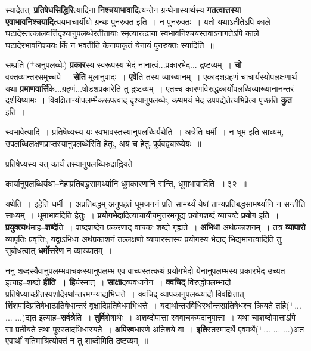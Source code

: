 \documentclass[article,12pt,a4paper]{memoir}
\newcommand{\add}[1]{($^{+}$#1)}
\begin{document}
	  \pstart स्यादेतत्--\textbf{प्रतिषेधसिद्धिरि}त्यादिना \textbf{निश्चयाभावादि}त्यन्तेन \leavevmode{} ग्रन्थेनास्यार्थस्य \textbf{गतत्वात्तस्या एवाभावनिश्चयादि}त्ययमाचार्यीयो ग्रन्थः पुनरुक्त इति । न पुनरुक्तः । यतो यथाऽतीतेऽपि काले घटादेस्तत्कालवर्त्तिदृश्यानुपलब्धेरतीतायाः स्मृत्यारूढाया स्वभावनिश्चयस्तवाऽनागतेऽपि काले घटादेरभावनिश्चयः किं न भवतीति केनापाकृतं येनायं पुनरुक्तः स्यादिति ॥
	\pend
      

	  \pstart सम्प्रति \add{अनुपलब्धेः} \textbf{प्रकार}स्य स्वरूपस्य भेदं नानात्वं...प्रकारभेद... द्रष्टव्यम् । \textbf{चो} वक्तव्यान्तरसमुच्चये । \textbf{सेति} मूलानुवादः । \textbf{एषे}ति तस्य व्याख्यानम् । एकादशग्रहणं चाचार्यस्योपलक्षणार्थं यथा \textbf{प्रमाणवार्त्ति}के...ग्रहणं...षोडशप्रकारेति तु द्रष्टव्यम् । एतच्च कारणविरुद्धकार्योपलब्धिव्याख्यानानन्तरं दर्शयिष्यामः । विवक्षितान्योपलम्भैकरूपत्वाद् दृश्यानुपलब्धेः, कथमयं भेद उपपद्येतेत्यभिप्रेत्य पृच्छति \textbf{कुत} इति ।  \leavevmode{} 
	  
	स्वभावेत्यादि । प्रतिषेध्यस्य यः स्वभावस्तस्यानुपलब्धिर्यथेति । अत्रेति धर्मी । न धूम इति साध्यम्, उपलब्धिलक्षणप्राप्तस्यानुपलब्धेरिति हेतुः, अयं च हेतुः पूर्ववद्व्याख्येयः ॥  
	  
	प्रतिषेध्यस्य यत् कार्यं तस्यानुपलब्धिरुदाह्नियते--  
	  
	कार्यानुपलब्धिर्यथा--नेहाप्रतिबद्धसामर्थ्यानि धूमकारणानि सन्ति, धूमाभावादिति ॥ ३२ ॥ 
	  
	यथेति । इहेति धर्मी । अप्रतिबद्धम् अनुपहतं धूमजननं प्रति सामर्थ्यं येषां तान्यप्रतिबद्धसामर्थ्यानि न सन्तीति साध्यम् । धूमाभावदिति हेतुः । \textbf{प्रयोगभेदा}दित्याचार्यीयमुत्तरमनूद्य प्रयोगशब्दं व्याचष्टे \textbf{प्रयो}ग इति । \textbf{प्रयुक्त्य}र्थमाह--\textbf{शब्दे}ति । शब्दशब्देन प्रकरणाद् वाचकः शब्दो गृह्यते । \textbf{अभिधा} अर्थप्रकाशनम् । तत्र \textbf{व्यापारो} व्यापृतिः प्रवृत्तिः, यद्वाऽभिधा अर्थप्रकाशनं तल्लक्षणो व्यापारस्तस्य प्रयोगस्य भेदाद् भिद्यमानत्वादिति तु सुबोधत्वात् \textbf{धर्मोत्तरेण} न व्याख्यातम् ।
	\pend
      

	  \pstart ननु शब्दस्यैवानुपलम्भवाचकस्यानुपलम्भ एव वाच्यस्तत्कथं प्रयोगभेदो येनानुपलम्भस्य प्रकारभेद उच्यत इत्याह--शब्दो \textbf{हीति । हि}र्यस्मात् । \textbf{साक्षा}दव्यवधानेन । \textbf{क्वचिद्} विरुद्धोपलम्भादौ प्रतिषेध्याच्छीतस्पर्शादेरर्थान्तरमग्न्याद्यभिधत्ते । क्वचिद् व्यापकानुपलब्ध्यादौ विवक्षितात् शिंशपादिप्रतिषेधात्प्रतिषेधान्तरं वृक्षादिप्रतिषेधमभिधत्ते । यद्यर्थान्तरविधिरर्थान्तरप्रतिषेधश्च क्रियते तर्हि\add{... ... ...}द्यत इत्याह--\textbf{सर्वत्रे}ति । \textbf{तुर्वि}शेषार्थः । अशब्दोपात्ता स्ववाचकपदानुपात्ता । यथा चाशब्दोपात्ताऽपि सा प्रतीयते तथा पुरस्तादभिधास्यते । \textbf{अपिरव}धारणे अतिशये वा । \textbf{इति}स्तस्मादर्थे एवमर्थे\add{... ... ...}अत एवार्थीं गतिमाश्रित्योक्तं न तु शाब्दीमिति द्रष्टव्यम् ॥
	\pend
      
\end{document}
